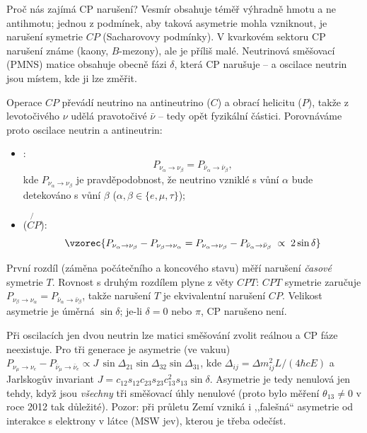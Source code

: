 Proč nás zajímá CP narušení? Vesmír obsahuje téměř výhradně hmotu a ne antihmotu; jednou z
podmínek, aby taková asymetrie mohla vzniknout, je narušení symetrie \(CP\) (Sacharovovy
podmínky). V kvarkovém sektoru CP narušení známe (kaony, \(B\)-mezony), ale je příliš malé.
Neutrinová směšovací (PMNS) matice obsahuje obecně fázi \(\delta\), která CP narušuje -- a
oscilace neutrin jsou místem, kde ji lze změřit.

Operace \(CP\) převádí neutrino na antineutrino (\(C\)) a obrací helicitu (\(P\)), takže z
levotočivého \(\nu\) udělá pravotočivé \(\bar\nu\) -- tedy opět fyzikální částici. Porovnáváme
proto oscilace neutrin a antineutrin:
\begin{itemize}
  \item {}:
        \[
          P_{\nu_\alpha\to\nu_\beta} = P_{\bar\nu_\alpha\to\bar\nu_\beta},
        \]
        kde \(P_{\nu_\alpha\to\nu_\beta}\) je pravděpodobnost, že neutrino vzniklé s vůní
        \(\alpha\) bude detekováno s vůní \(\beta\) (\(\alpha,\beta\in\{e,\mu,\tau\}\));
  \item {} (\(\not{\!CP}\)):
        \[
          \vzorec{P_{\nu_\alpha\to\nu_\beta} - P_{\nu_\beta\to\nu_\alpha}
          = P_{\nu_\alpha\to\nu_\beta} - P_{\bar\nu_\alpha\to\bar\nu_\beta}
          \;\propto\; 2\sin\delta}
        \]
\end{itemize}
První rozdíl (záměna počátečního a koncového stavu) měří narušení \emph{časové}
symetrie \(T\). Rovnost s druhým rozdílem plyne z věty \(CPT\): \(CPT\) symetrie zaručuje
\(P_{\nu_\beta\to\nu_\alpha} = P_{\bar\nu_\alpha\to\bar\nu_\beta}\), takže narušení \(T\) je
ekvivalentní narušení \(CP\). Velikost asymetrie je úměrná \(\sin\delta\); je-li \(\delta=0\)
nebo \(\pi\), CP narušeno není.

\begin{vysvetleni}
  Při oscilacích jen dvou neutrin lze matici směšování zvolit reálnou a CP fáze neexistuje.
  Pro tři generace je asymetrie (ve vakuu)
  \(P_{\nu_\mu\to\nu_e}-P_{\bar\nu_\mu\to\bar\nu_e} \propto J\,
  \sin\Delta_{21}\sin\Delta_{32}\sin\Delta_{31}\), kde \(\Delta_{ij}=\Delta m^2_{ij}L/(4\hbar cE)\)
  a Jarlskogův invariant \(J=c_{12}s_{12}c_{23}s_{23}c_{13}^2s_{13}\sin\delta\). Asymetrie je
  tedy nenulová jen tehdy, když jsou \emph{všechny} tři směšovací úhly nenulové (proto bylo
  měření \(\theta_{13}\neq0\) v roce 2012 tak důležité). Pozor: při průletu Zemí vzniká i
  ,,falešná`` asymetrie od interakce s elektrony v látce (MSW jev), kterou je třeba odečíst.
\end{vysvetleni}

